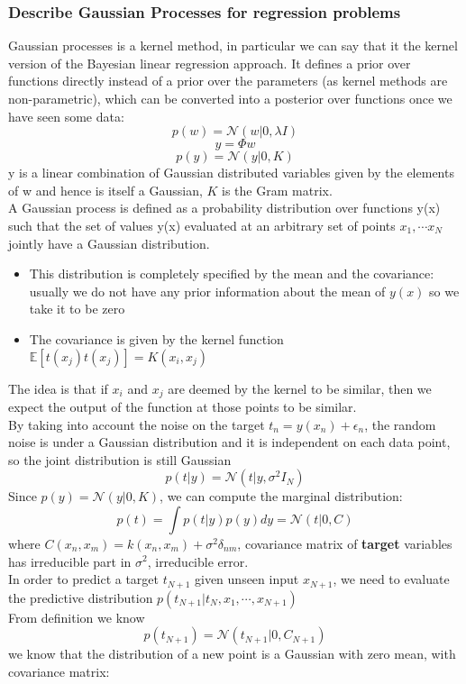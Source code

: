 \subsubsection{Describe Gaussian Processes for regression problems}
    Gaussian processes is a kernel method, in particular we can say that it the kernel version of the Bayesian linear regression approach. It defines a prior over functions directly instead of a prior over the parameters (as kernel methods are non-parametric), which can be converted into a posterior over functions once we have seen some data:
    $$p(w)=\mathcal{N}(w|0,\lambda I)$$ $$y=\Phi w$$ $$p(y)=\mathcal{N}(y|0,K)$$
    y is a linear combination of Gaussian distributed variables given by the elements of w and hence is itself a Gaussian, $K$ is the Gram matrix.\\
    A Gaussian process is defined as a probability distribution over functions y(x) such that the set of values y(x) evaluated at an arbitrary set of points $x_1,\cdots x_N$ jointly have a Gaussian distribution.
    \begin{itemize}
        \item This distribution is completely specified by the mean and the covariance: usually we do not have any prior information about the mean of $y(x)$ so we take it to be zero
        \item The covariance is given by the kernel function $\mathbb{E}[t(x_j)t(x_j)]=K(x_i,x_j)$
    \end{itemize}
    The idea is that if $x_i$ and $x_j$ are deemed by the kernel to be similar, then we expect the output of the function at those points to be similar.\\
    By taking into account the noise on the target $t_n=y(x_n)+\epsilon_n$, the random noise is under a Gaussian distribution and it is independent on each data point, so the joint distribution is still Gaussian
    $$p(t|y)=\mathcal{N}(t|y,\sigma^2I_N)$$
    Since $p(y)=\mathcal{N}(y|0,K)$, we can compute the marginal distribution: $$p(t)=\int p(t|y)p(y)dy=\mathcal{N}(t|0,C)$$ where $C(x_n,x_m)=k(x_n,x_m)+\sigma^2\delta_{nm}$, covariance matrix of \textbf{target} variables has irreducible part in $\sigma^2$, irreducible error.\\
    In order to predict a target $t_{N+1}$ given unseen input $x_{N+1}$, we need to evaluate the predictive distribution $p(t_{N+1}|t_N,x_1,\cdots,x_{N+1})$\\
    From definition we know
    $$p(t_{N+1})=\mathcal{N}(t_{N+1}|0,C_{N+1})$$
    we know that the distribution of a new point is a Gaussian with zero mean, with covariance matrix:

